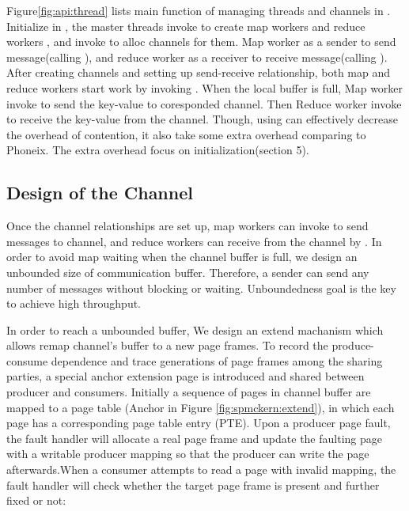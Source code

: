 Figure\ref{fig:api:thread} lists main function of managing threads and channels in \myth.
Initialize in \myds, the master threads invoke 
 to create map workers and reduce workers
, and invoke  to alloc channels for them.
Map worker as a sender to send message(calling ),
and reduce worker as a receiver to receive message(calling ).
After creating channels and setting up send-receive relationship,
both map and reduce workers start work by invoking .
When the local buffer is full, 
Map worker invoke  to send
the key-value to coresponded channel.
Then Reduce worker invoke  to receive
the key-value from the channel. 
Though, using \myth can effectively decrease the overhead of contention,
it also take some extra overhead comparing to Phoneix. 
The extra overhead focus on initialization(section 5). 






\subsection{Design of the Channel}
Once the channel relationships are set up, 
map workers can invoke  to send messages to channel,
and reduce workers can receive from the channel by .
In order to avoid map waiting when the channel buffer is full,
we design an unbounded size of communication buffer.
Therefore, a sender can send any number of messages without blocking or waiting.
Unboundedness goal is the key to achieve high throughput.

In order to reach a unbounded buffer,
We design an extend machanism 
which allows remap channel’s buffer to a new page frames.
To record the produce-consume dependence and 
trace generations of page frames among the sharing parties, 
a special anchor extension page is introduced and shared between producer and consumers.
Initially a sequence of pages in channel buffer 
are mapped to a  page table (Anchor in Figure
\ref{fig:spmckern:extend}), 
in which each page has a corresponding page table entry (PTE).
Upon a producer page fault, the fault handler will allocate a real page frame and update the faulting page with a
writable producer mapping so that the producer can write the
page afterwards.When a consumer attempts to read a page
with invalid mapping, the fault handler will check whether
the target page frame is present and further fixed or not:
 

